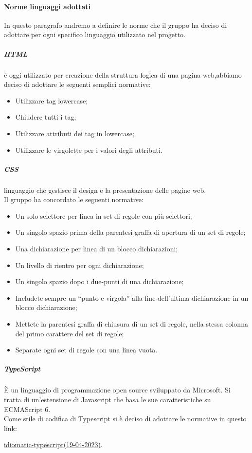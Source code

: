 	\paragraph{Norme linguaggi adottati} 
 	In questo paragrafo andremo a definire le norme che il gruppo ha deciso di adottare per ogni specifico linguaggio utilizzato nel progetto.
	\subparagraph*{HTML} è oggi utilizzato per creazione della struttura logica di una pagina web,abbiamo 	 deciso di adottare le seguenti semplici normative:
	\begin{itemize}
	\item Utilizzare tag lowercase;
	\item Chiudere tutti i tag;
	\item Utilizzare attributi dei tag in lowercase;
	\item Utilizzare le virgolette per i valori degli attributi.
	\end{itemize}	
	
	\subparagraph*{CSS} linguaggio che gestisce il design e la presentazione delle pagine web. \\
	Il gruppo ha concordato le seguenti normative:
	\begin{itemize}
	\item Un solo selettore per linea in set di regole con più selettori;
	\item Un singolo spazio prima della parentesi graffa di apertura di un set di regole;
	\item Una dichiarazione per linea di un blocco dichiarazioni;
	\item  Un livello di rientro per ogni dichiarazione;
	\item Un singolo spazio dopo i due-punti di una dichiarazione;
	\item Includete sempre un “punto e virgola” alla fine dell'ultima dichiarazione in un blocco dichiarazione;
	\item Mettete la parentesi graffa di chiusura di un set di regole, nella stessa colonna del primo carattere del set di regole;
	\item Separate ogni set di regole con una linea vuota.
	\end{itemize}
	
	\subparagraph*{TypeScript} È un linguaggio di programmazione open source sviluppato da Microsoft.
Si tratta di un’estensione di Javascript che basa le sue caratteristiche su ECMAScript 6. \\
Come stile di codifica di Typescript si è deciso di adottare le normative in questo link:
\begin{center}
\href{https://github.com/roblarsen/idiomatic-typescript}{idiomatic-typescript(19-04-2023)}.
\end{center}

